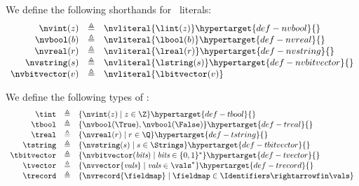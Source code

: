 We define the following shorthands for \nativevalue\ literals:
\hypertarget{def-nvint}{}
\[
\begin{array}{rcl}
\nvint(z)       &\triangleq& \nvliteral{\lint(z)}           \hypertarget{def-nvbool}{}\\
\nvbool(b)      &\triangleq& \nvliteral{\lbool(b)}          \hypertarget{def-nvreal}{}\\
\nvreal(r)      &\triangleq& \nvliteral{\lreal(r)}          \hypertarget{def-nvstring}{}\\
\nvstring(s)    &\triangleq& \nvliteral{\lstring(s)}        \hypertarget{def-nvbitvector}{}\\
\nvbitvector(v) &\triangleq& \nvliteral{\lbitvector(v)}\\
\end{array}
\]

We define the following types of \nativevalues:
\hypertarget{def-tint}{}
\[
\begin{array}{rcl}
  \tint       &\triangleq& \{ \nvint(z) \;|\; z \in \Z\}                                        \hypertarget{def-tbool}{}\\
  \tbool      &\triangleq& \{ \nvbool(\True), \nvbool(\False) \}                                \hypertarget{def-treal}{}\\
  \treal      &\triangleq& \{ \nvreal(r) \;|\; r \in \Q\}                                       \hypertarget{def-tstring}{}\\
  \tstring    &\triangleq& \{ \nvstring(s) \;|\; s \in \Strings\}  \hypertarget{def-tbitvector}{}\\
  \tbitvector &\triangleq& \{ \nvbitvector(\textit{bits}) \;|\; \textit{bits} \in \{0,1\}^*\}   \hypertarget{def-tvector}{}\\
  \tvector    &\triangleq& \{ \nvvector{\textit{vals}} \;|\; \textit{vals} \in \vals^*\}        \hypertarget{def-trecord}{}\\
  \trecord  &\triangleq& \{ \nvrecord{\fieldmap} \;|\; \fieldmap \in \Identifiers\rightarrowfin\vals\}\\
\end{array}
\]

